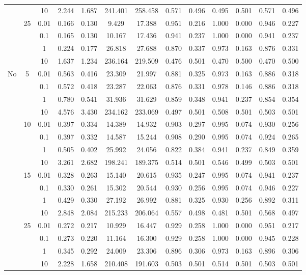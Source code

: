 \documentclass[11pt]{article}
\theoremstyle{definition}
\begin{document}
\begin{sidewaysfigure}
\begin{tabular}{c|cccccc|cccccc}
& & 10 & 2.244 & 1.687 & 241.401 & 258.458 & 0.571 & 0.496 & 0.495 & 0.501 & 0.571 & 0.496\\[.5cm]  
& \multirow{4}{*}{25}   & 0.01   & 0.166 & 0.130 & 9.429 & 17.388 & 0.951 & 0.216 & 1.000 & 0.000 & 0.946 & 0.227 \\ 
& & 0.1  & 0.165 & 0.130 & 10.167 & 17.436 & 0.941 & 0.237 & 1.000 & 0.000 & 0.941 & 0.237 \\ 
& & 1 & 0.224 & 0.177 & 26.818 & 27.688 & 0.870 & 0.337 & 0.973 & 0.163 & 0.876 & 0.331 \\ 
&  &  10 & 1.637 & 1.234 & 236.164 & 219.509 & 0.476 & 0.501 & 0.470 & 0.500 & 0.470 & 0.500 \\
\hline 
  \multirow{16}{*}{No} & \multirow{4}{*}{5}  & 0.01 & 0.563 & 0.416 & 23.309 & 21.997 & 0.881 & 0.325 & 0.973 & 0.163 & 0.886 & 0.318 \\ 
   &  & 0.1 & 0.572 & 0.418 & 23.287 & 22.063 & 0.876 & 0.331 & 0.978 & 0.146 & 0.886 & 0.318 \\ 
  &  & 1  & 0.780 & 0.541 & 31.936 & 31.629 & 0.859 & 0.348 & 0.941 & 0.237 & 0.854 & 0.354 \\ 
   &  & 10  & 4.576 & 3.430 & 234.162 & 233.069 & 0.497 & 0.501 & 0.508 & 0.501 & 0.503 & 0.501 \\[.3cm]  
  & \multirow{4}{*}{10}  & 0.01 & 0.397 & 0.334 & 14.389 & 14.932 & 0.903 & 0.297 & 0.995 & 0.074 & 0.930 & 0.256 \\ 
  & & 0.1 & 0.397 & 0.332 & 14.587 & 15.244 & 0.908 & 0.290 & 0.995 & 0.074 & 0.924 & 0.265 \\ 
  & & 1  & 0.505 & 0.402 & 25.992 & 24.056 & 0.822 & 0.384 & 0.941 & 0.237 & 0.849 & 0.359 \\ 
  &  & 10  & 3.261 & 2.682 & 198.241 & 189.375 & 0.514 & 0.501 & 0.546 & 0.499 & 0.503 & 0.501 \\[.3cm]  
  & \multirow{4}{*}{15}  & 0.01 & 0.328 & 0.263 & 15.140 & 20.615 & 0.935 & 0.247 & 0.995 & 0.074 & 0.941 & 0.237 \\ 
  &   & 0.1 & 0.330 & 0.261 & 15.302 & 20.544 & 0.930 & 0.256 & 0.995 & 0.074 & 0.946 & 0.227 \\ 
  & & 1  & 0.429 & 0.330 & 27.192 & 26.992 & 0.881 & 0.325 & 0.930 & 0.256 & 0.892 & 0.311 \\ 
   & & 10  & 2.848 & 2.084 & 215.233 & 206.064 & 0.557 & 0.498 & 0.481 & 0.501 & 0.568 & 0.497 \\[.3cm]  
   & \multirow{4}{*}{25}   & 0.01 & 0.272 & 0.217 & 10.929 & 16.447 & 0.929 & 0.258 & 1.000 & 0.000 & 0.951 & 0.217 \\ 
  &  & 0.1 & 0.273 & 0.220 & 11.164 & 16.300 & 0.929 & 0.258 & 1.000 & 0.000 & 0.945 & 0.228 \\ 
  &  & 1  & 0.345 & 0.292 & 24.009 & 23.306 & 0.896 & 0.306 & 0.973 & 0.163 & 0.896 & 0.306 \\ 
   &  & 10  & 2.228 & 1.658 & 210.408 & 191.603 & 0.503 & 0.501 & 0.514 & 0.501 & 0.503 & 0.501 \\ 
\end{tabular}
\end{sidewaysfigure}
\end{document}
